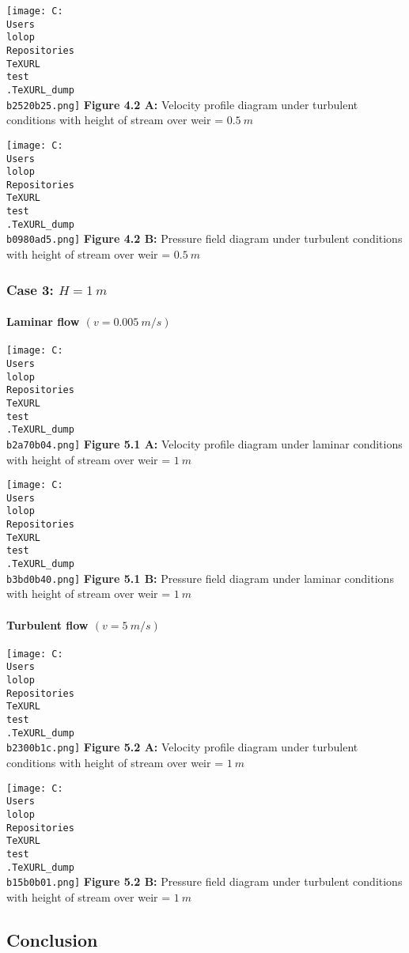 \documentclass[11pt]{article}
\begin{document}
\texttt{[image: C:\\Users\\lolop\\Repositories\\TeXURL\\test\\.TeXURL\_dump\\b2520b25.png]} \textbf{Figure 4.2 A:}
Velocity profile diagram under turbulent conditions with height of
stream over weir = \(0.5\ m\)

\texttt{[image: C:\\Users\\lolop\\Repositories\\TeXURL\\test\\.TeXURL\_dump\\b0980ad5.png]} \textbf{Figure 4.2 B:}
Pressure field diagram under turbulent conditions with height of stream
over weir = \(0.5\ m\)

\hypertarget{case-3-h-1-m-1}{%
\subsubsection{\texorpdfstring{Case 3:
\(H = 1\ m\)}{Case 3: H = 1\textbackslash{} m}}\label{case-3-h-1-m-1}}

\hypertarget{laminar-flow-v-0.005-ms-2}{%
\paragraph{\texorpdfstring{Laminar flow
\((v = 0.005\ m/s)\)}{Laminar flow (v = 0.005\textbackslash{} m/s)}}\label{laminar-flow-v-0.005-ms-2}}

\texttt{[image: C:\\Users\\lolop\\Repositories\\TeXURL\\test\\.TeXURL\_dump\\b2a70b04.png]} \textbf{Figure 5.1 A:}
Velocity profile diagram under laminar conditions with height of stream
over weir = \(1\ m\)

\texttt{[image: C:\\Users\\lolop\\Repositories\\TeXURL\\test\\.TeXURL\_dump\\b3bd0b40.png]} \textbf{Figure 5.1 B:}
Pressure field diagram under laminar conditions with height of stream
over weir = \(1\ m\)

\hypertarget{turbulent-flow-v-5-ms-2}{%
\paragraph{\texorpdfstring{Turbulent flow
\((v = 5\ m/s)\)}{Turbulent flow (v = 5\textbackslash{} m/s)}}\label{turbulent-flow-v-5-ms-2}}

\texttt{[image: C:\\Users\\lolop\\Repositories\\TeXURL\\test\\.TeXURL\_dump\\b2300b1c.png]} \textbf{Figure 5.2 A:}
Velocity profile diagram under turbulent conditions with height of
stream over weir = \(1\ m\)

\texttt{[image: C:\\Users\\lolop\\Repositories\\TeXURL\\test\\.TeXURL\_dump\\b15b0b01.png]} \textbf{Figure 5.2 B:}
Pressure field diagram under turbulent conditions with height of stream
over weir = \(1\ m\)

\hypertarget{conclusion}{%
\subsection{Conclusion}\label{conclusion}}
\end{document}
